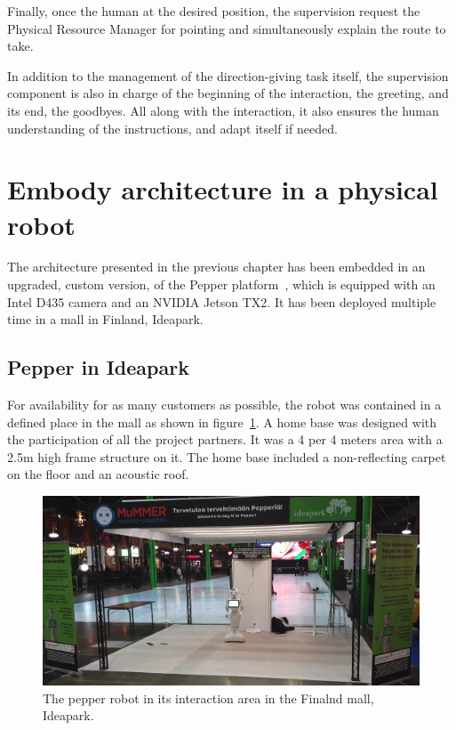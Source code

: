 Finally, once the human at the desired position, the supervision request the Physical Resource Manager for pointing and simultaneously explain the route to take.

In addition to the management of the direction-giving task itself, the supervision component is also in charge of the beginning of the interaction, the greeting, and its end, the goodbyes. All along with the interaction, it also ensures the human understanding of the instructions, and adapt itself if needed.

\section{Embody architecture in a physical robot}

The architecture presented in the previous chapter has been embedded in an upgraded, custom version, of the Pepper platform~\cite{caniot_2020_adapted}, which is equipped with an Intel D435 camera and an NVIDIA Jetson TX2. It has been deployed multiple time in a mall in Finland, Ideapark.

\subsection{Pepper in Ideapark}

For availability for as many customers as possible, the robot was contained in a defined place in the mall as shown in figure~\ref{fig:chap8_pepper_mall}. A home base was designed with the participation of all the project partners. It was a 4 per 4 meters area with a 2.5m high frame structure on it. The home base included a non-reflecting carpet on the floor and an acoustic roof.

\begin{figure}[ht!]
\centering
\includegraphics[scale=0.12]{figures/chapter8/pepper_mall.png}
\caption{\label{fig:chap8_pepper_mall} The pepper robot in its interaction area in the Finalnd mall, Ideapark. }
\end{figure}

